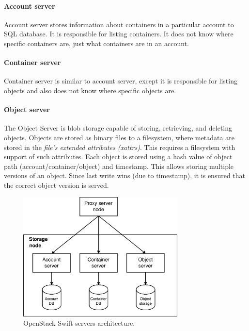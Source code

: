     \paragraph{Account server}
    Account server stores information about containers in a particular account to SQL database. It is responsible for listing containers. It does not know where specific containers are, just what containers are in an account\cite{SwiftArchitecturalOverview}.

    \paragraph{Container server}
    Container server is similar to account server, except it is responsible for listing objects and also does not know where specific objects are\cite{SwiftArchitecturalOverview}.

    \paragraph{Object server}
    The Object Server is blob storage capable of storing, retrieving, and deleting objects. Objects are stored as binary files to a filesystem, where metadata are stored in the \textit{file's extended attributes (xattrs)}. This requires a filesystem with support of such attributes. Each object is stored using a hash value of object path (account/container/object) and timestamp. This allows storing multiple versions of an object. Since last write wins (due to timestamp), it is ensured that the correct object version is served\cite{SwiftArchitecturalOverview}.

    \begin{figure}[H]
        \centering
        \includegraphics[width=0.75\textwidth]{obrazky-figures/swift-servers.eps}
        \caption{OpenStack Swift servers architecture.}
        \label{fig:swiftServers}
    \end{figure}

